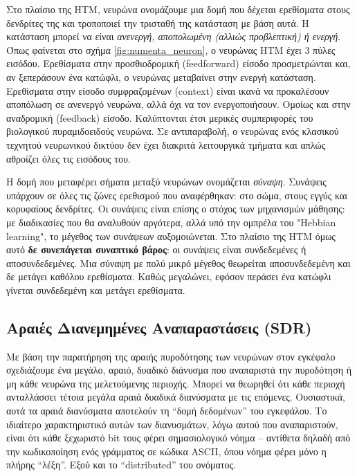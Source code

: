 Στο πλαίσιο της HTM, νευρώνα ονομάζουμε μια δομή που δέχεται ερεθίσματα στους δενδρίτες της και τροποποιεί την τρισταθή της κατάσταση με βάση αυτά.
Η κατάσταση μπορεί να είναι \textit{ανενεργή, αποπολωμένη (αλλιώς προβλεπτική) ή ενεργή}.
Όπως φαίνεται στο σχήμα \ref{fig:numenta_neuron}, ο νευρώνας HTM έχει 3 πύλες εισόδου.
Ερεθίσματα στην προσθιοδρομική (feedforward) είσοδο προσμετρώνται και, αν ξεπεράσουν ένα κατώφλι, ο νευρώνας μεταβαίνει στην ενεργή κατάσταση.
Ερεθίσματα στην είσοδο συμφραζομένων (context) είναι ικανά να προκαλέσουν αποπόλωση σε ανενεργό νευρώνα, αλλά όχι να τον ενεργοποιήσουν.
Ομοίως και στην αναδρομική (feedback) είσοδο.
Καλύπτονται έτσι μερικές συμπεριφορές του βιολογικού πυραμιδοειδούς νευρώνα.
Σε αντιπαραβολή, ο νευρώνας ενός κλασικού τεχνητού νευρωνικού δικτύου δεν έχει διακριτά λειτουργικά τμήματα και απλώς αθροίζει όλες τις εισόδους του.

Η δομή που μεταφέρει σήματα μεταξύ νευρώνων ονομάζεται \textit{σύναψη}. Συνάψεις υπάρχουν σε όλες τις ζώνες ερεθισμού που αναφέρθηκαν:
στο σώμα, στους εγγύς και κορυφαίους δενδρίτες.
Οι συνάψεις είναι επίσης ο στόχος των μηχανισμών μάθησης: με διαδικασίες που θα αναλυθούν αργότερα, αλλά υπό την ομπρέλα του "Hebbian learning",
το μέγεθος των συνάψεων αυξομοιώνεται.
Στο πλαίσιο της HTM όμως αυτό \textbf{δε συνεπάγεται συναπτικό βάρος}: οι συνάψεις είναι συνδεδεμένες ή αποσυνδεδεμένες.
Μια σύναψη με πολύ μικρό μέγεθος θεωρείται αποσυνδεδεμένη και δε μετάγει καθόλου ερεθίσματα.
Καθώς μεγαλώνει, εφόσον περάσει ένα κατώφλι γίνεται συνδεδεμένη και μετάγει ερεθίσματα.

\subsection{Αραιές Διανεμημένες Αναπαραστάσεις (SDR)}

Με βάση την παρατήρηση της αραιής πυροδότησης των νευρώνων στον εγκέφαλο σχεδιάζουμε ένα μεγάλο, αραιό, δυαδικό διάνυσμα που αναπαριστά την πυροδότηση ή μη κάθε νευρώνα της μελετούμενης περιοχής.
Μπορεί να θεωρηθεί ότι κάθε περιοχή ανταλλάσσει τέτοια μεγάλα αραιά δυαδικά διανύσματα με τις επόμενες.
Ουσιαστικά, αυτά τα αραιά διανύσματα αποτελούν τη ``δομή δεδομένων'' \cite{neuronssynapses,sdrkanerva} του εγκεφάλου.
Το ιδιαίτερο χαρακτηριστικό αυτών των διανυσμάτων, λόγω αυτού που αναπαριστούν, είναι ότι κάθε ξεχωριστό bit τους φέρει σημασιολογικό νόημα -- αντίθετα δηλαδή από την κωδικοποίηση ενός γράμματος σε κώδικα ASCII, όπου νόημα φέρει μόνο η πλήρης ``λέξη''.
Εξού και το ``distributed'' του ονόματος.

